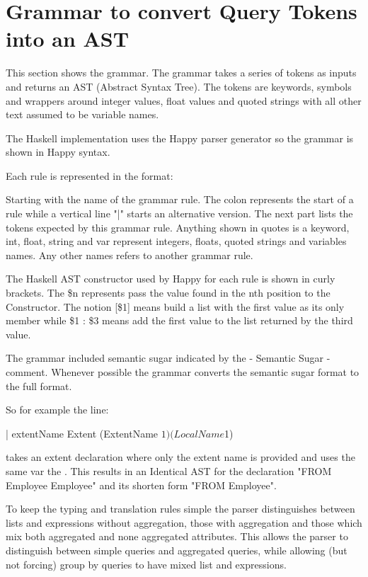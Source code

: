 \section{Grammar to convert Query Tokens into an AST}
\label{sec_Grammar}
This section shows the \SNEEql grammar. 
The grammar takes a series of tokens as inputs and returns an AST (Abstract Syntax Tree).
The tokens are keywords, symbols and wrappers around integer values, float values and quoted strings with all other text assumed to be variable names.

The Haskell implementation uses the Happy parser generator so the grammar is shown in Happy syntax.

Each rule is represented in the format:


Starting with the name of the grammar rule.
The colon represents the start of a rule while a vertical line "|" starts an alternative version.
The next part lists the tokens expected by this grammar rule.
Anything shown in quotes is a keyword, int, float, string and var represent integers, floats, quoted strings and variables names.
Any other names refers to another grammar rule.

The Haskell AST constructor used by Happy for each rule is shown in curly brackets. The \$n represents pass the value found in the nth position to the Constructor. The notion [\$1] means build a list with the first value as its only member while \$1 : \$3 means add the first value to the list returned by the third value.

The grammar included semantic sugar indicated by the   {- Semantic Sugar -} comment.
Whenever possible the grammar converts the semantic sugar format to the full format.

So for example the line:
\begin{code}
  | extentName  { Extent (ExtentName $1) (LocalName $1) }
\end{code}
takes an extent declaration where only the extent name is provided and uses the same var  the .
This results in an Identical AST for the declaration "FROM Employee Employee" and its shorten form "FROM Employee".
  
To keep the typing and translation rules simple the parser distinguishes between lists and expressions without aggregation, those with aggregation and those which mix both aggregated and none aggregated attributes.
This allows the parser to distinguish between simple queries and aggregated queries, while allowing (but not forcing) group by queries to have mixed list and expressions.

